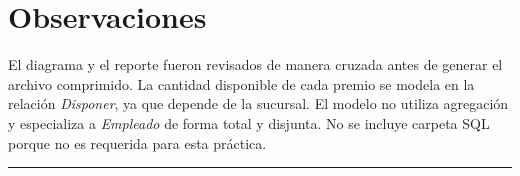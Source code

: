 \documentclass[11pt,letterpaper]{article}
\begin{document}
\section*{Observaciones}

El diagrama y el reporte fueron revisados de manera cruzada antes de generar
el archivo comprimido. La cantidad disponible de cada premio se modela en la
relación \emph{Disponer}, ya que depende de la sucursal. El modelo no utiliza
agregación y especializa a \emph{Empleado} de forma total y disjunta. No se
incluye carpeta SQL porque no es requerida para esta práctica.

\vfill
\begin{center}
  \color{unamgold}\rule{0.75\textwidth}{0.8pt}
\end{center}
\end{document}
